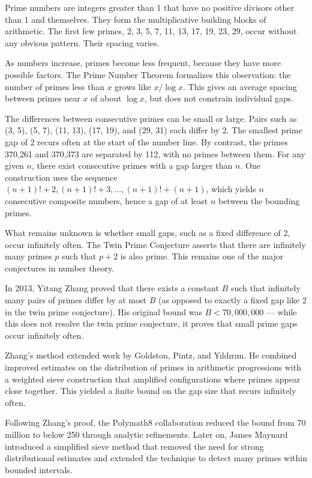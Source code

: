 Prime numbers are integers greater than 1 that have no positive divisors other than 1 and themselves. They form the multiplicative building blocks of arithmetic. The first few primes, 2, 3, 5, 7, 11, 13, 17, 19, 23, 29, occur without any obvious pattern. Their spacing varies.

As numbers increase, primes become less frequent, because they have more possible factors. The Prime Number Theorem formalizes this observation: the number of primes less than $x$ grows like $x / \log x$. This gives an average spacing between primes near $x$ of about $\log x$, but does not constrain individual gaps.

The differences between consecutive primes can be small or large. Pairs such as (3, 5), (5, 7), (11, 13), (17, 19), and (29, 31) each differ by 2. The smallest prime gap of 2 recurs often at the start of the number line. By contrast, the primes 370,261 and 370,373 are separated by 112, with no primes between them. For any given $n$, there exist consecutive primes with a gap larger than $n$. One construction uses the sequence $(n+1)! + 2,  (n+1)! + 3,  \dots,  (n+1)! + (n+1)$, which yields $n$ consecutive composite numbers, hence a gap of at least $n$ between the bounding primes.

What remains unknown is whether small gaps, such as a fixed difference of 2, occur infinitely often. The Twin Prime Conjecture asserts that there are infinitely many primes $p$ such that $p + 2$ is also prime. This remains one of the major conjectures in number theory.

In 2013, Yitang Zhang proved that there exists a constant $B$ such that infinitely many pairs of primes differ by at most $B$ (as opposed to exactly a fixed gap like 2 in the twin prime conjecture). His original bound was $B < 70{,}000{,}000$ — while this does not resolve the twin prime conjecture, it proves that small prime gaps occur infinitely often.

Zhang's method extended work by Goldston, Pintz, and Yıldırım. He combined improved estimates on the distribution of primes in arithmetic progressions with a weighted sieve construction that amplified configurations where primes appear close together. This yielded a finite bound on the gap size that recurs infinitely often.

Following Zhang's proof, the Polymath8 collaboration reduced the bound from 70 million to below 250 through analytic refinements. Later on, James Maynard introduced a simplified sieve method that removed the need for strong distributional estimates and extended the technique to detect many primes within bounded intervals.

